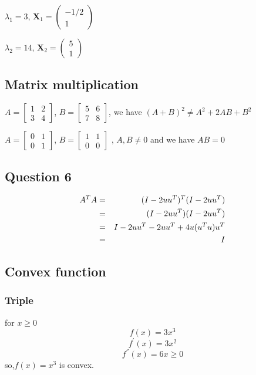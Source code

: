 \documentclass[english,11pt]{article}
\begin{document}
$\lambda_{1}=3$, $\boldsymbol{X}_{1}=\left(\begin{array}{c}
-1/2\\
1
\end{array}\right)$

$\lambda_{2}=14$, $\boldsymbol{X}_{2}=\left(\begin{array}{c}
5\\
1
\end{array}\right)$

\subsection{Matrix multiplication}

$A=\left[\begin{array}{cc}
1 & 2\\
3 & 4
\end{array}\right]$, $B=\left[\begin{array}{cc}
5 & 6\\
7 & 8
\end{array}\right]$, we have $(A+B)^{2}\neq A^{2}+2AB+B^{2}$ 

$A=\left[\begin{array}{cc}
0 & 1\\
0 & 1
\end{array}\right]$, $B=\left[\begin{array}{cc}
1 & 1\\
0 & 0
\end{array}\right]$ , $A,B\neq0$ and we have $AB=0$

\subsection{Question 6}

\begin{eqnarray}
A^{T}A & = & (I-2uu^{T})^{T}(I-2uu^{T}) \notag \\
 & = & (I-2uu^{T})(I-2uu^{T}) \notag \\
 & = & I-2uu^{T}-2uu^{T}+4u(u^{T}u)u^{T} \notag \\
 & = & I
\end{eqnarray}

\subsection{Convex function}
\subsubsection{Triple}
for $x\geq 0$
\begin{equation}
f(x)  =  3x^{3}
\end{equation}
\begin{equation}
f^{'}(x)  =  3x^{2} 
\end{equation}
\begin{equation}
f^{''}(x)  =  6x \geq 0
\end{equation}
so,$f(x)=x^{3}$ is convex.
\end{document}
